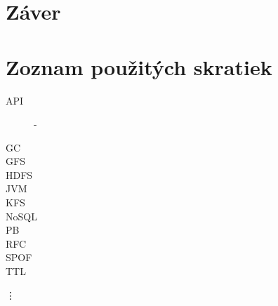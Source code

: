 \documentclass[11pt,twoside,a4paper]{book}
\begin{document}
\chapter{Záver}








%
{
\def\CS{$\cal C\kern-0.1667em\lower.5ex\hbox{$\cal S$}\kern-0.075em $}

}

%

\appendix



\chapter{Zoznam použitých skratiek}
\begin{description}
\item[]

\item[API] - 
\item[GC]
\item[GFS]
\item[HDFS]
\item[JVM]
\item[KFS]
\item[NoSQL]
\item[PB]
\item[]
\item[RFC]
\item[SPOF]
\item[TTL]
\end{description}
\vdots
\end{document}

